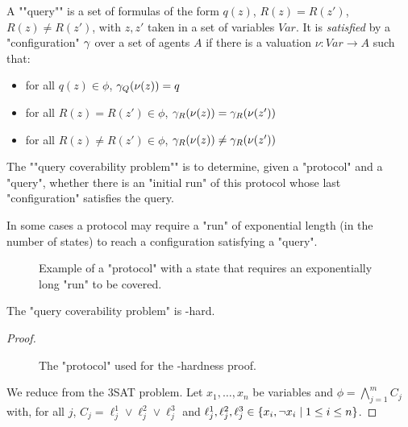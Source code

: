 \begin{definition}
	A ""query"" is a set of formulas of the form $q(z)$, $R(z) = R(z')$, $R(z) \neq R(z')$, with $z, z'$ taken in a set of variables $Var$.
	It is \emph{satisfied} by a "configuration" $\gamma$ over a set of agents $A$ if there is a valuation $\nu : Var \to A$ such that:
	\begin{itemize}
		\item for all $q(z) \in \phi$, $\gamma_Q(\nu(z)) = q$
		
		\item for all $R(z) = R(z') \in \phi$, $\gamma_R(\nu(z)) = \gamma_R(\nu(z'))$
		
		\item for all $R(z) \neq R(z') \in \phi$, $\gamma_R(\nu(z)) \neq \gamma_R(\nu(z'))$
	\end{itemize}

	\AP The ""query coverability problem"" is to determine, given a "protocol" and a "query", whether there is an "initial run" of this protocol whose last "configuration" satisfies the query.
\end{definition}

\begin{ex}
	In some cases a protocol may require a "run" of exponential length (in the number of states) to reach a configuration satisfying a "query".
	
	\begin{figure}[h]
		
		\label{fig:exp-run}
		\caption{Example of a "protocol" with a state that requires an exponentially long "run" to be covered.}
	\end{figure}
	
\end{ex}

\begin{proposition}
	The "query coverability problem" is \np-hard.
\end{proposition}

\begin{proof}
	\begin{figure}[h]
		
		\label{fig:np-hard}
		\caption{The "protocol" used for the \np-hardness proof.}
	\end{figure}
	
	We reduce from the 3SAT problem.
	Let $x_1, \ldots, x_n$ be variables and $\phi = \bigwedge_{j=1}^m C_j$ with, for all $j$, $C_j = \ell_j^1 \lor \ell_j^2 \lor \ell_j^3$ and $\ell_j^1, \ell_j^2, \ell_j^3 \in \{x_i, \neg x_i \mid 1 \leq i \leq n\}$. 
	
\end{proof}


